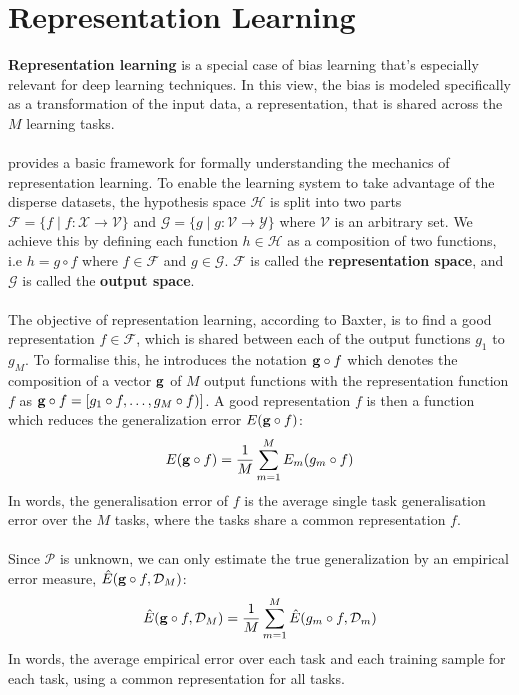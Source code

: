 \section{Representation Learning}
\label{representation_learning}
\textbf{Representation learning} is a special case of bias learning that's especially relevant for deep learning techniques. In this view, the bias is modeled specifically as a transformation of the input data, a representation, that is shared across the $M$ learning tasks.
\\\\
\citet{baxter1995} provides a basic framework for formally understanding the mechanics of representation learning. To enable the learning system to take advantage of the disperse datasets, the hypothesis space $\mathcal{H}$ is split into two parts $\mathcal{F} = \{f \mid f: \mathcal{X} \to \mathcal{V}\}$ and $\mathcal{G} = \{g \mid g: \mathcal{V} \to \mathcal{Y} \}$ where $\mathcal{V}$ is an arbitrary set. We achieve this by defining each function $h \in \mathcal{H}$ as a composition of two functions, i.e $h = g \circ f$ where $f \in \mathcal{F}$ and $g \in \mathcal{G}$. $\mathcal{F}$ is called the \textbf{representation space}, and $\mathcal{G}$ is called the \textbf{output space}.
\\\\
The objective of representation learning, according to Baxter, is to find a good representation $f \in \mathcal{F}$, which is shared between each of the output functions $g_1$ to $g_M$. To formalise this, he introduces the notation $\mathbf{g} \circ f$ which denotes the composition of a vector $\mathbf{g}$ of $M$ output functions with the representation function $f$ as $\mathbf{g} \circ f = [g_1 \circ f, \dots, g_M \circ f)]$. A good representation $f$ is then a function which reduces the generalization error $E(\mathbf{g} \circ f)$:
$$
E(\mathbf{g} \circ f) = \frac{1}{M}\sum\limits_{m = 1}^M E_m(g_m \circ f)
$$
In words, the generalisation error of $f$ is the average single task generalisation error over the $M$ tasks, where the tasks share a common representation $f$.
\\\\
Since $\mathcal{P}$ is unknown, we can only estimate the true generalization by an empirical error measure, $\hat{E}(\mathbf{g} \circ f,\mathcal{D}_M)$:
$$
\hat{E}(\mathbf{g} \circ f,\mathcal{D}_M) = \frac{1}{M} \sum\limits_{m = 1}^M \hat{E}(g_m \circ f, \mathcal{D}_m)
$$
In words, the average empirical error over each task and each training sample for each task, using a common representation for all tasks.
